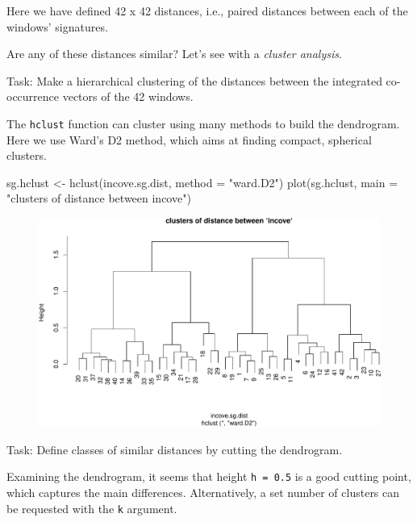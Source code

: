 \documentclass[
  letterpaper,
  DIV=11,
  numbers=noendperiod]{scrartcl}
\newenvironment{Shaded}{\begin{snugshade}}{\end{snugshade}}
\newcommand{\AttributeTok}[1]{\textcolor[rgb]{0.40,0.45,0.13}{#1}}
\newcommand{\FunctionTok}[1]{\textcolor[rgb]{0.28,0.35,0.67}{#1}}
\newcommand{\NormalTok}[1]{\textcolor[rgb]{0.00,0.23,0.31}{#1}}
\newcommand{\OtherTok}[1]{\textcolor[rgb]{0.00,0.23,0.31}{#1}}
\newcommand{\StringTok}[1]{\textcolor[rgb]{0.13,0.47,0.30}{#1}}
\begin{document}
Here we have defined 42 x 42 distances, i.e., paired distances between
each of the windows' signatures.

Are any of these distances similar? Let's see with a \emph{cluster
analysis}.

Task: Make a hierarchical clustering of the distances between the
integrated co-occurrence vectors of the 42 windows.

The \texttt{hclust} function can cluster using many methods to build the
dendrogram. Here we use Ward's D2 method, which aims at finding compact,
spherical clusters.

\begin{Shaded}
\begin{Highlighting}[]
\NormalTok{sg.hclust }\OtherTok{\textless{}{-}} \FunctionTok{hclust}\NormalTok{(incove.sg.dist, }\AttributeTok{method =} \StringTok{"ward.D2"}\NormalTok{)}
\FunctionTok{plot}\NormalTok{(sg.hclust, }\AttributeTok{main =} \StringTok{"clusters of distance between \textasciigrave{}incove\textasciigrave{}"}\NormalTok{)}
\end{Highlighting}
\end{Shaded}

\begin{figure}[H]

{\centering \includegraphics{PatternAnalysisWorkshopTutorial_files/figure-pdf/incove.cluster-1.pdf}

}

\end{figure}

Task: Define classes of similar distances by cutting the dendrogram.

Examining the dendrogram, it seems that height \texttt{h\ =\ 0.5} is a
good cutting point, which captures the main differences. Alternatively,
a set number of clusters can be requested with the \texttt{k} argument.
\end{document}

